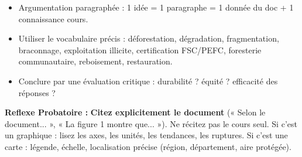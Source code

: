\documentclass[11pt]{article}
\newcommand{\cle}[1]{{\popxbold\color{popdark}#1}}
\begin{document}
\begin{methode}
\begin{enumerate}
\begin{itemize}
            \item Argumentation paragraphée : 1 idée = 1 paragraphe = 1 donnée du doc + 1 connaissance cours.
            \item Utiliser le vocabulaire précis : \cle{déforestation}, \cle{dégradation}, \cle{fragmentation}, \cle{braconnage}, \cle{exploitation illicite}, \cle{certification FSC/PEFC}, \cle{foresterie communautaire}, \cle{reboisement}, \cle{restauration}.
            \item Conclure par une évaluation critique : durabilité ? équité ? efficacité des réponses ?
        \end{itemize}
    \end{enumerate}
    \textbf{Reflexe Probatoire :} \textbf{Citez explicitement le document} (« Selon le document... », « La figure 1 montre que... »). Ne récitez pas le cours seul. Si c'est un graphique : lisez les axes, les unités, les tendances, les ruptures. Si c'est une carte : légende, échelle, localisation précise (région, département, aire protégée).
\end{methode}
\end{document}

